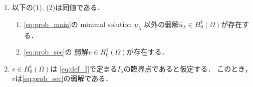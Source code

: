 \begin{lem} \label{lem:rel_heart_spade}
 \begin{enumerate}[1.]
  \item 以下の(1), (2)は同値である．
        \begin{enumerate}[(1)]
         \item \ref{eq:prob_main}の minimal solution $\underline{u}_\lambda$
               以外の弱解$\bar{u}_\lambda \in H_0^1(\Omega)$が存在する．
         \item \ref{eq:prob_sec}の
               弱解$v \in H_0^1(\Omega)$が存在する．
        \end{enumerate}
  \item $v \in H_0^1(\Omega)$は
        \eqref{eq:def_I}で定まる$I_\lambda$の臨界点であると仮定する．
        このとき，$v$は\ref{eq:prob_sec}の弱解である．
 \end{enumerate}
\end{lem}

